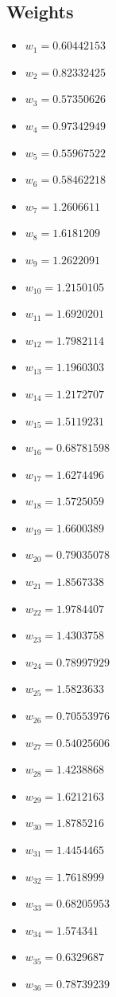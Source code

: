 \documentclass[11pt]{article}
\begin{document}
\subsection*{Weights}
\begin{itemize}
\item $w_{1} = 0.60442153$
\item $w_{2} = 0.82332425$
\item $w_{3} = 0.57350626$
\item $w_{4} = 0.97342949$
\item $w_{5} = 0.55967522$
\item $w_{6} = 0.58462218$
\item $w_{7} = 1.2606611$
\item $w_{8} = 1.6181209$
\item $w_{9} = 1.2622091$
\item $w_{10} = 1.2150105$
\item $w_{11} = 1.6920201$
\item $w_{12} = 1.7982114$
\item $w_{13} = 1.1960303$
\item $w_{14} = 1.2172707$
\item $w_{15} = 1.5119231$
\item $w_{16} = 0.68781598$
\item $w_{17} = 1.6274496$
\item $w_{18} = 1.5725059$
\item $w_{19} = 1.6600389$
\item $w_{20} = 0.79035078$
\item $w_{21} = 1.8567338$
\item $w_{22} = 1.9784407$
\item $w_{23} = 1.4303758$
\item $w_{24} = 0.78997929$
\item $w_{25} = 1.5823633$
\item $w_{26} = 0.70553976$
\item $w_{27} = 0.54025606$
\item $w_{28} = 1.4238868$
\item $w_{29} = 1.6212163$
\item $w_{30} = 1.8785216$
\item $w_{31} = 1.4454465$
\item $w_{32} = 1.7618999$
\item $w_{33} = 0.68205953$
\item $w_{34} = 1.574341$
\item $w_{35} = 0.6329687$
\item $w_{36} = 0.78739239$

\end{itemize}
\end{document}
